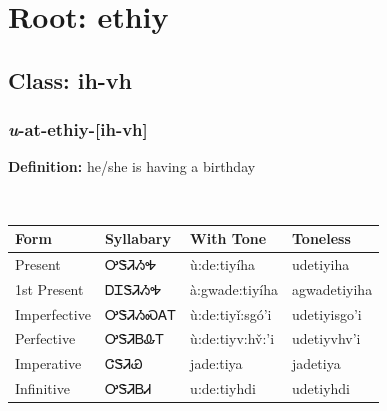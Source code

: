 \needspace{4in}
\section*{Root: ethiy}
\nopagebreak
{}
\needspace{3in}
\subsection*{Class: ih-vh}
\nopagebreak
\needspace{2in}
\subsubsection*{\textit{u}{-}at{-}\textbf{ethiy}{-}[ih-vh]}
\nopagebreak
\textbf{Definition: } he/she is having a birthday
\\[0.5em]
\begin{tabularx}{\textwidth}{l X X X}%
\toprule%
\textbf{Form}&\textbf{Syllabary}&\textbf{With Tone}&\textbf{Toneless}\\%
\midrule%
Present&ᎤᏕᏘᏱᎭ&ù:de:tiyíha&udetiyiha\\%
1st Present&ᎠᏆᏕᏘᏱᎭ&à:gwade:tiyíha&agwadetiyiha\\%
Imperfective&ᎤᏕᏘᏱᏍᎪᎢ&ù:de:tiyǐ:sgó’i&udetiyisgo’i\\%
Perfective&ᎤᏕᏘᏴᎲᎢ&ù:de:tiyv:hv̌:’i&udetiyvhv’i\\%
Imperative&ᏣᏕᏘᏯ&jade:tiya&jadetiya\\%
Infinitive&ᎤᏕᏘᏴᏗ&u:de:tiyhdi&udetiyhdi\\%
\bottomrule%
\end{tabularx}
\\[1em]